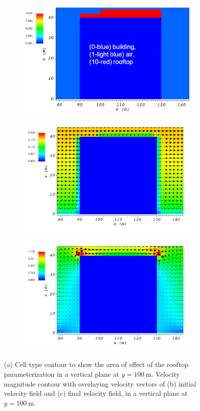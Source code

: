 \begin{figure}[H]
    \centering
    \begin{subfigure}{\textwidth}
    \centering
    \includegraphics[width=10.3cm,keepaspectratio]{Images/rooftop_y_100_1_init_icell.png}
    \caption{}
    \end{subfigure}
    \begin{subfigure}{\textwidth}
    \centering
    \includegraphics[width=11.0cm,keepaspectratio]{Images/rooftop_y_100_1_init_vel.png}
    \caption{}
    \end{subfigure}
    \begin{subfigure}{\textwidth}
    \centering
    \includegraphics[width=11.0cm,keepaspectratio]{Images/rooftop_y_100_1_final.png}
    \caption{}
    \end{subfigure}
    \caption{(a) Cell type contour to show the area of effect of the rooftop parameterization in a vertical plane at $y=100\ \si{\meter}$. Velocity magnitude contour with overlaying velocity vectors of (b) initial velocity field and (c) final velocity field, in a vertical plane at $y=100\ \si{\meter}$.}
\end{figure}


